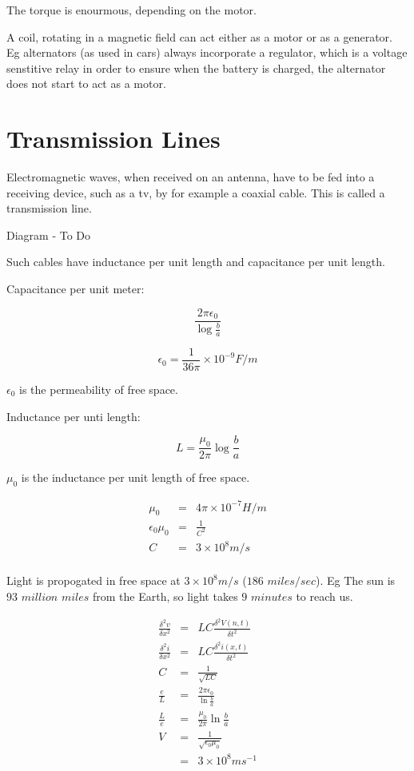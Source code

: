 \documentclass[a4paper,12pt]{article}
\begin{document}
The torque is enourmous, depending on the motor.


A coil, rotating in a magnetic field can act either as a motor or as a
generator. Eg alternators (as used in cars) always incorporate a
regulator, which is a voltage senstitive relay in order to ensure when
the battery is charged, the alternator does not start to act as a motor.

\section{Transmission Lines}

Electromagnetic waves, when received on an antenna, have to be fed into
a receiving device, such as a tv, by for example a coaxial cable. This
is called a transmission line.

\begin{table}[hbtp]

Diagram - To Do

\end{table}

Such cables have inductance per unit length and capacitance per unit
length.

Capacitance per unit meter:

\[ \frac{2 \pi \epsilon_{0}}{\log{\frac{b}{a}}} \]

\[ \epsilon_{0} = \frac{1}{36 \pi} \times 10^{-9} F / m \]

$\epsilon_{0}$ is the permeability of free space.

Inductance per unti length:

\[ L = \frac{\mu_{0}}{2 \pi} \log{\frac{b}{a}} \]

$\mu_{0}$ is the inductance per unit length of free space.

\begin{eqnarray*}
\mu_{0} & = & 4 \pi \times 10^{-7} H / m \\
\epsilon_{0} \mu_{0} & = & \frac{1}{C^{2}} \\
C & = & 3 \times 10^{8} m / s \\
\end{eqnarray*}

Light is propogated in free space at $3 \times 10^{8} m / s$ ($186$ $miles
/sec$). Eg The sun is $93$ $million$ $miles$ from the Earth, so light takes
$9$ $minutes$ to reach us.



\begin{eqnarray*}
\frac{\delta^{2} v}{\delta x^{2}} & = & L C \frac{\delta^{2} V (n,t)}{\delta t^{2}} \\
\frac{\delta^{2} i}{\delta x^{2}} & = & L C \frac{\delta^{2} i(x,t)}{\delta t^{2}} \\
C & = & \frac{1}{\sqrt{LC}} \\
\frac{e}{L} & = & \frac{2 \pi \epsilon_{0}}{\ln{\frac{b}{a}}} \\
\frac{L}{e} & = & \frac{\mu_{0}}{2 \pi} \ln{\frac{b}{a}} \\
V & = & \frac{1}{\sqrt{\epsilon_{0} \mu_{0}}} \\
  & = & 3 \times 10^{8} m s^{-1}
\end{eqnarray*}
\end{document}

